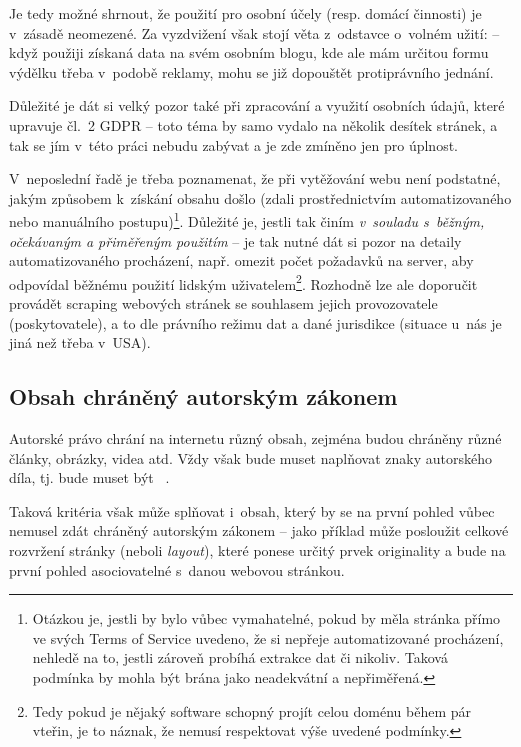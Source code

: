 \documentclass[thesis=B,czech]{FITthesis}[2012/06/26]
\begin{document}
Je tedy možné shrnout, že použití pro osobní účely (resp. domácí činnosti) je v zásadě neomezené. Za vyzdvižení však stojí věta z~odstavce o~volném užití:  -- když použiji získaná data na svém osobním blogu, kde ale mám určitou formu výdělku třeba v~podobě reklamy, mohu se již dopouštět protiprávního jednání.

Důležité je dát si velký pozor také při zpracování a využití osobních údajů, které upravuje čl.~2 GDPR -- toto téma by samo vydalo na několik desítek stránek, a tak se jím v~této práci nebudu zabývat a je zde zmíněno jen pro úplnost.

V~neposlední řadě je třeba poznamenat, že při vytěžování webu není podstatné, jakým způsobem k získání obsahu došlo (zdali prostřednictvím automatizovaného nebo manuálního postupu)\footnote{Otázkou je, jestli by bylo vůbec vymahatelné, pokud by měla stránka přímo ve svých Terms of Service uvedeno, že si nepřeje automatizované procházení, nehledě na to, jestli zároveň probíhá extrakce dat či nikoliv. Taková podmínka by mohla být brána jako neadekvátní a nepřiměřená.}. Důležité je, jestli tak činím \emph{v~souladu s~běžným, očekávaným a přiměřeným použitím} -- je tak nutné dát si pozor na detaily automatizovaného procházení, např. omezit počet požadavků na server, aby odpovídal běžnému použití lidským uživatelem\footnote{Tedy pokud je nějaký software schopný projít celou doménu během pár vteřin, je to náznak, že nemusí respektovat výše uvedené podmínky.}. Rozhodně lze ale doporučit provádět scraping webových stránek se souhlasem jejich provozovatele (poskytovatele), a to dle právního režimu dat a dané jurisdikce (situace u~nás je jiná než třeba v~USA).~\cite{rozhovor}

\subsection{Obsah chráněný autorským zákonem}
Autorské právo chrání na internetu různý obsah, zejména budou chráněny různé články, obrázky, videa atd. Vždy však bude muset naplňovat znaky autorského díla, tj. bude muset být ~\cite[\S~2 odst.~1]{autorsky_zakon}.

Taková kritéria však může splňovat i~obsah, který by se na první pohled vůbec nemusel zdát chráněný autorským zákonem -- jako příklad může posloužit celkové rozvržení stránky (neboli \textit{layout}), které ponese určitý prvek originality a bude na první pohled asociovatelné s~danou webovou stránkou.
\end{document}

